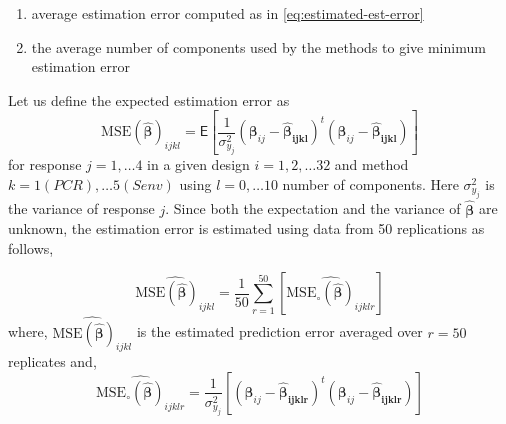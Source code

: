 \documentclass[12pt,3p,authoryear]{elsarticle}
\providecommand{\tightlist}{%
  \setlength{\itemsep}{0pt}\setlength{\parskip}{0pt}}
\begin{document}
\begin{enumerate}
\def\labelenumi{\alph{enumi})}
\tightlist
\item
  average estimation error computed as in \eqref{eq:estimated-est-error}
\item
  the average number of components used by the methods to give minimum estimation error
\end{enumerate}

Let us define the expected estimation error as
\begin{equation}
  \text{MSE}\left(
    \widehat{\boldsymbol{\beta}}
  \right)_{ijkl} =
  \mathsf{E}{\left[
    \frac{1}{\sigma_{y_j}^2}\left(
      \boldsymbol{\beta}_{ij} - \boldsymbol{\widehat{\beta}_{ijkl}}
    \right)^t
    \left(
      \boldsymbol{\beta}_{ij} - \boldsymbol{\widehat{\beta}_{ijkl}}
    \right)
  \right]}
\label{eq:est-error}
\end{equation}
for response \(j = 1, \ldots 4\) in a given design \(i=1, 2, \ldots 32\) and method \(k=1(PCR), \ldots 5(Senv)\) using \(l=0, \ldots 10\) number of components. Here \(\sigma_{y_j}^2\) is the variance of response \(j\). Since both the expectation and the variance of \(\widehat{\boldsymbol{\beta}}\) are unknown, the estimation error is estimated using data from 50 replications as follows,

\begin{equation}
\widehat{\text{MSE}\left(\widehat{\boldsymbol{\beta}}\right)_{ijkl}} =
  \frac{1}{50}\sum_{r=1}^{50}{\left[
    \widehat{\text{MSE}_\circ\left(\widehat{\boldsymbol{\beta}}\right)_{ijklr}}  
  \right]}
\label{eq:estimated-est-error}
\end{equation}
where, \(\widehat{\text{MSE}\left(\widehat{\boldsymbol{\beta}}\right)_{ijkl}}\) is the estimated prediction error averaged over \(r=50\) replicates and,
\[\widehat{\text{MSE}_\circ\left(\boldsymbol{\widehat{\beta}}\right)_{ijklr}} = 
  \frac{1}{\sigma_{y_j}^2}\left[\left(\boldsymbol{\beta}_{ij} -\boldsymbol{\widehat{\beta}_{ijklr}}\right)^t\left(\boldsymbol{\beta}_{ij} - \boldsymbol{\widehat{\beta}_{ijklr}}\right)
\right]\]
\end{document}
